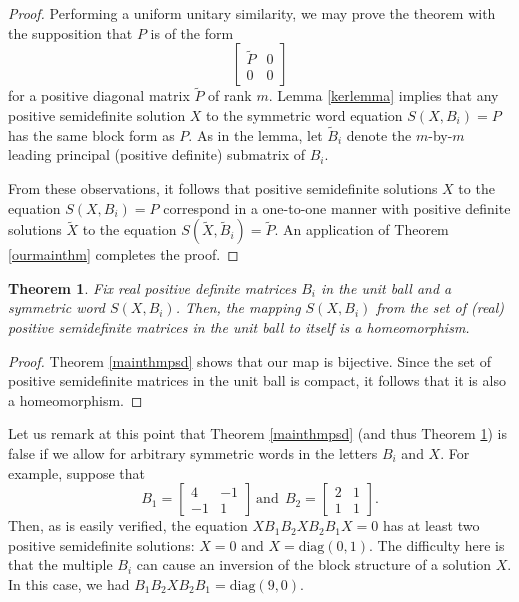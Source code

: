 \documentclass{amsart}
\newtheorem{thm}{Theorem}[section]
\theoremstyle{definition}
\theoremstyle{remark}
\numberwithin{equation}{section}
\newcommand{\<}{\langle}
\renewcommand{\>}{\rangle}
\begin{document}
\begin{proof}
Performing a uniform unitary similarity, we may prove the theorem with the supposition that $P$ is of the form \[\left[\begin{array}{cc} \widetilde P & 0 \\0 & 0\end{array}\right]\] for a positive diagonal matrix $\widetilde P$ of rank $m$.  Lemma \ref{kerlemma} implies that any positive semidefinite solution $X$ to the symmetric word equation $S(X,B_i) = P$ has the same block form as $P$.  As in the lemma, let $\widetilde B_i$ denote the $m$-by-$m$ leading principal (positive definite) submatrix of $B_i$.  

From these observations, it follows that positive semidefinite solutions $X$ to the equation $S(X,B_i) = P$ correspond in a one-to-one manner with positive definite solutions $\widetilde X$ to the equation $S(\widetilde X,\widetilde B_i) = \widetilde P$.  An application of Theorem \ref{ourmainthm} completes the proof.
\end{proof}

\begin{thm}\label{unitballhomeo}
Fix real positive definite matrices $B_i$ in the unit ball and a
symmetric word $S(X,B_i)$.  Then, the mapping $S(X,B_i)$ from the
set of (real) positive semidefinite matrices in the unit ball to
itself is a homeomorphism.
\end{thm}

\begin{proof}
Theorem \ref{mainthmpsd} shows that our map is bijective.  Since the set of positive semidefinite matrices in the unit ball is compact, it follows that it is also a homeomorphism.
\end{proof}

Let us remark at this point that Theorem \ref{mainthmpsd} (and thus Theorem \ref{unitballhomeo}) is false if we allow for arbitrary symmetric words in the letters $B_i$ and $X$.  For example, suppose that \[ B_1 = \left[\begin{array}{cc}4 & -1 \\-1 & 1\end{array}\right] \ \text{and}  \ \ B_2 = \left[\begin{array}{cc}2 & 1 \\1 & 1\end{array}\right].\]  Then, as is easily verified, the equation $XB_1B_2XB_2B_1X =  0$ has at least two positive semidefinite solutions: $X = 0$ and $X = \text{diag}(0,1)$.  The difficulty here is that the multiple $B_i$ can cause an inversion of the block structure of a solution $X$.  In this case, we had $B_1B_2XB_2B_1 =  \text{diag}(9,0)$.
\end{document}

